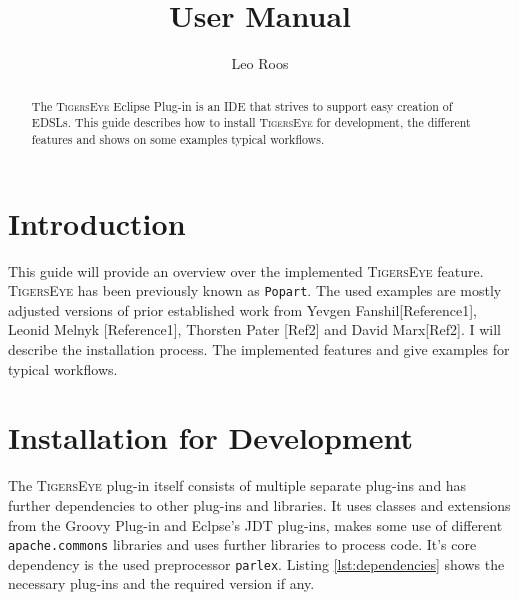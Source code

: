 \documentclass[article,colorback,accentcolor=tud4c]{tudreport}
\title{\tiger \version \\User Manual}
\subtitle{Leo Roos}
\newcommand\tiger{%
  \textsc{TigersEye}
}
\begin{document}
\maketitle
\begin{abstract}
  The \tiger Eclipse Plug-in is an IDE that strives to support easy creation of EDSLs. This guide describes how to install  \tiger for development, the different features and shows on some examples typical workflows.
\end{abstract}  

\tableofcontents

  \section{Introduction}
	This guide will provide an overview over the implemented \tiger feature. \tiger has been previously known as \texttt{Popart}. The used examples are mostly adjusted versions of prior established work from Yevgen Fanshil[Reference1], Leonid Melnyk [Reference1], Thorsten Pater [Ref2] and David Marx[Ref2].
	I will describe the installation process. The implemented features and give examples for typical workflows.

  \section{Installation for Development}
	
	The \tiger plug-in itself consists of multiple separate plug-ins and has further dependencies to other plug-ins and libraries. It uses classes and extensions from the Groovy Plug-in and  Eclpse's JDT plug-ins, makes some use of different \texttt{apache.commons} libraries and uses further libraries to process code. It's core dependency is the used preprocessor \texttt{parlex}. Listing \ref{lst:dependencies} shows the necessary plug-ins and the required version if any.
	
\end{document}
